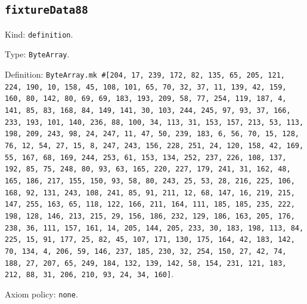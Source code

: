 \documentclass[11pt]{article}
\begin{document}
\subsection*{\texttt{fixtureData88}}
\noindent Kind: \texttt{definition}.\par
\noindent Type: \texttt{ByteArray}.\par
\noindent Definition: \texttt{ByteArray.mk \#[204, 17, 239, 172, 82, 135, 65, 205, 121, 224, 190, 10, 158, 45, 108, 101, 65, 70, 32, 37, 11, 139, 42, 159, 160, 80, 142, 80, 69, 69, 183, 193, 209, 58, 77, 254, 119, 187, 4, 141, 85, 83, 168, 84, 149, 141, 30, 103, 244, 245, 97, 93, 37, 166, 233, 193, 101, 140, 236, 88, 100, 34, 113, 31, 153, 157, 213, 53, 113, 198, 209, 243, 98, 24, 247, 11, 47, 50, 239, 183, 6, 56, 70, 15, 128, 76, 12, 54, 27, 15, 8, 247, 243, 156, 228, 251, 24, 120, 158, 42, 169, 55, 167, 68, 169, 244, 253, 61, 153, 134, 252, 237, 226, 108, 137, 192, 85, 75, 248, 80, 93, 63, 165, 220, 227, 179, 241, 31, 162, 48, 165, 186, 217, 155, 150, 93, 58, 80, 243, 25, 53, 28, 216, 225, 106, 168, 92, 131, 243, 108, 241, 85, 91, 211, 12, 68, 147, 16, 219, 215, 147, 255, 163, 65, 118, 122, 166, 211, 164, 111, 185, 185, 235, 222, 198, 128, 146, 213, 215, 29, 156, 186, 232, 129, 186, 163, 205, 176, 238, 36, 111, 157, 161, 14, 205, 144, 205, 233, 30, 183, 198, 113, 84, 225, 15, 91, 177, 25, 82, 45, 107, 171, 130, 175, 164, 42, 183, 142, 70, 134, 4, 206, 59, 146, 237, 185, 230, 32, 254, 150, 27, 42, 74, 188, 27, 207, 65, 249, 184, 132, 139, 142, 58, 154, 231, 121, 183, 212, 88, 31, 206, 210, 93, 24, 34, 160]}.\par
\noindent Axiom policy: \texttt{none}.\par
\end{document}
